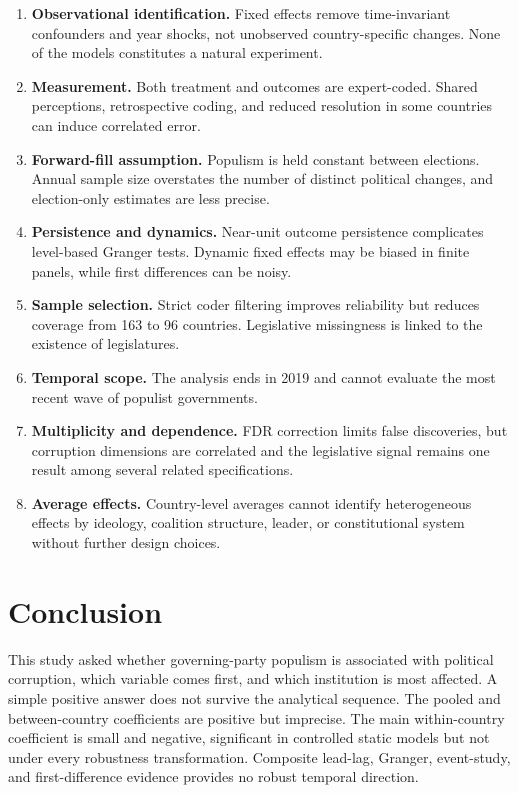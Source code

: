 \begin{enumerate}
  \item \textbf{Observational identification.} Fixed effects remove time-invariant confounders and
  year shocks, not unobserved country-specific changes. None of the models constitutes a natural
  experiment.
  \item \textbf{Measurement.} Both treatment and outcomes are expert-coded. Shared perceptions,
  retrospective coding, and reduced resolution in some countries can induce correlated error.
  \item \textbf{Forward-fill assumption.} Populism is held constant between elections. Annual sample
  size overstates the number of distinct political changes, and election-only estimates are less
  precise.
  \item \textbf{Persistence and dynamics.} Near-unit outcome persistence complicates level-based
  Granger tests. Dynamic fixed effects may be biased in finite panels, while first differences can be
  noisy.
  \item \textbf{Sample selection.} Strict coder filtering improves reliability but reduces coverage
  from 163 to 96 countries. Legislative missingness is linked to the existence of legislatures.
  \item \textbf{Temporal scope.} The analysis ends in 2019 and cannot evaluate the most recent wave of
  populist governments.
  \item \textbf{Multiplicity and dependence.} FDR correction limits false discoveries, but corruption
  dimensions are correlated and the legislative signal remains one result among several related
  specifications.
  \item \textbf{Average effects.} Country-level averages cannot identify heterogeneous effects by
  ideology, coalition structure, leader, or constitutional system without further design choices.
\end{enumerate}

\section{Conclusion}

This study asked whether governing-party populism is associated with political corruption, which
variable comes first, and which institution is most affected. A simple positive answer does not
survive the analytical sequence. The pooled and between-country coefficients are positive but
imprecise. The main within-country coefficient is small and negative, significant in controlled
static models but not under every robustness transformation. Composite lead-lag, Granger, event-study,
and first-difference evidence provides no robust temporal direction.


